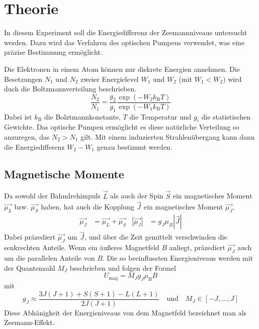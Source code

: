 \section{Theorie}
\label{sec:Theorie}
In diesem Experiment soll die Energiedifferenz der Zeemannniveaus untersucht werden. Dazu wird das Verfahren des optischen Pumpens verwendet, was eine präzise Bestimmung ermöglicht.

Die Elektronen in einem Atom können nur diskrete Energien annehmen. Die Besetzungen $N_1$ und $N_2$  zweier Energielevel $W_1$ und $W_2$ (mit $W_1<W_2$) wird duch die Boltzmannverteilung beschrieben.
\begin{equation}
	\frac{N_2}{N_1}=\frac{g_2}{g_1}\frac{\exp(-W_2k_\mathrm{B}T)}{\exp(-W_1k_\mathrm{B}T)}
	\label{eqn:Bolztmann}
\end{equation}
Dabei ist $k_\mathrm{B}$ die Bolztmannkonstante, $T$ die Temperatur und $g_i$ die statistischen Gewichte. Das optische Pumpen ermöglicht es diese natürliche Verteilung so anzuregen, das $N_2 > N_1$ gilt. Mit einem induzierten Strahlenübergang kann dann die Energiedifferenz $W_2-W_1$ genau bestimmt werden.
\subsection{Magnetische Momente}
Da sowohl der Bahndrehimpuls $\vec{L}$ als auch der Spin $\vec{S}$ ein magnetisches Moment $\vec{\mu_L}$ bzw. $\vec{\mu_S}$ haben, hat auch die Kopplung $\vec{J}$ ein magnetisches Moment $\vec{\mu_J}$.
\begin{align}
	\vec{\mu_J}&=\vec{\mu_L} +\vec{\mu_S} & \left| \vec{\mu_J} \right|&=g_J\mu_B\left| \vec{J} \right|
\end{align}
Dabei präzediert $\vec{\mu_J}$ um $\vec{J}$, und über die Zeit gemittelt verschwinden die senkrechten Anteile.
Wenn ein äußeres Magnetfeld $B$ anliegt, präzediert $\vec{\mu_J}$ auch um die parallelen Anteile von $B$. Die so beeinflussten Energieniveaus werden mit der Quantenzahl $M_J$ beschrieben und folgen der Formel
\begin{equation}
	U_\mathrm{mag} = M_J g_J \mu_\mathrm{B}B
\end{equation}
mit
\begin{equation}
	g_J\approx \frac{3J(J+1)+S(S+1)-L(L+1)}{2J(J+1)} \quad \text{und}\quad M_J \in [-J,...,J]
\end{equation}
Diese Abhänigkeit der Energieniveaus von dem Magnetfeld bezeichnet man als Zeemann-Effekt.
